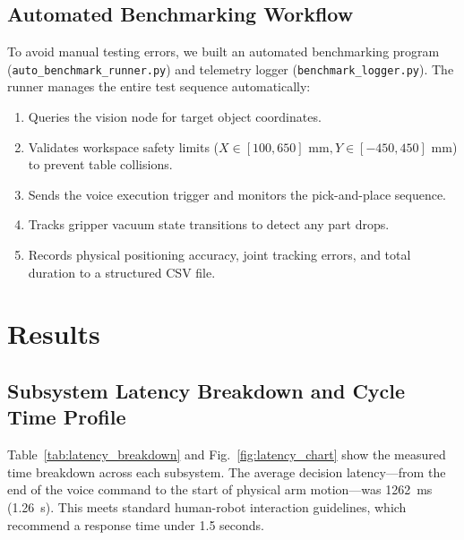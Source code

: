 \documentclass{svproc}
\begin{document}
\subsection{Automated Benchmarking Workflow}
To avoid manual testing errors, we built an automated benchmarking program (\texttt{auto\_benchmark\_runner.py}) and telemetry logger (\texttt{benchmark\_logger.py}). The runner manages the entire test sequence automatically:
\begin{enumerate}
    \item Queries the vision node for target object coordinates.
    \item Validates workspace safety limits ($X \in [100, 650]\text{ mm}, Y \in [-450, 450]\text{ mm}$) to prevent table collisions.
    \item Sends the voice execution trigger and monitors the pick-and-place sequence.
    \item Tracks gripper vacuum state transitions to detect any part drops.
    \item Records physical positioning accuracy, joint tracking errors, and total duration to a structured CSV file.
\end{enumerate}

\FloatBarrier
\section{Results}
\label{sec:results}

\subsection{Subsystem Latency Breakdown and Cycle Time Profile}
Table~\ref{tab:latency_breakdown} and Fig.~\ref{fig:latency_chart} show the measured time breakdown across each subsystem. The average decision latency—from the end of the voice command to the start of physical arm motion—was \SI{1262}{\milli\second} (\SI{1.26}{\second}). This meets standard human-robot interaction guidelines, which recommend a response time under 1.5 seconds.
\end{document}
